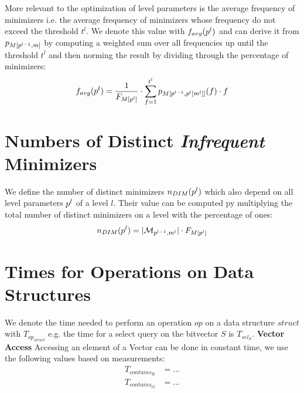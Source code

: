 \documentclass[a4paper,titlepage,onecolumn,oneside,12pt,nenglish,titlepage=firstiscover]{scrbook}
\theoremstyle{plain} %
\theoremstyle{definition} %
\theoremstyle{remark} %
\theoremstyle{plain}
\newcommand{\minimizerLength}{m}
\newcommand{\threshold}{t}
\newcommand{\level}{l}
\newcommand{\contains}{contains}
\newcommand{\select}{sel}
\newcommand{\timeForOperationOnStructure}[2]{T_{#1_{#2}}} %
\newcommand{\averageFrequency}{f_{avg}}
\begin{document}
More relevant to the optimization of level parameters is the average frequency of \infrequent minimizers i.e. the average frequency of minimizers whose frequency do not exceed the threshold $\threshold^\level$. We denote this value with $\averageFrequency(\levelParameters{\level})$ and can derive it from $\probabilityDistribution{\manualZV{M}{\levelParameters{\level-1}}{m}}$ by computing a weighted sum over all frequencies up until the threshold $\threshold^\level$ and then norming the result by dividing through the percentage of \infrequent minimizers:
\begin{equation} \label{equation:averageFrequency}
	\averageFrequency(\levelParameters{\level}) = \frac{1}{\CDF{\compactZV{M}{\levelParameters{\level}}}} \cdot
	\sum\limits_{f=1}^{\threshold^\level} \probabilityDistribution{\manualZV{M}{\levelParameters{\level-1}}{\parameterAccess{\level}{\minimizerLength}{\level}}}(f) \cdot f 
\end{equation}

\section{Numbers of Distinct \textit{Infrequent} Minimizers}
\newcommand{\numberOfDistinctMinimizers}[1]{n_{DIM}(#1)}
\newcommand{\varNumberOfDistinctMinimizers}{\textbf{n}_{\textbf{DIM}}}
We define the number of distinct \infrequent minimizers $\numberOfDistinctMinimizers{\levelParameters{\level}}$ which also depend on all level parameters $\levelParameters{\level}$ of a level $\level$.  Their value can be computed py multiplying the total number of distinct minimizers on a level with the percentage of \infrequent ones:
\begin{equation}
	\numberOfDistinctMinimizers{\levelParameters{\level}} = |\distinctMinimizers{\level}| \cdot \CDF{\compactZV{M}{\levelParameters{\level}}}
\end{equation}

\section{Times for Operations on Data Structures}
We denote the time needed to perform an operation $op$ on a data structure $struct$ with $\timeForOperationOnStructure{op}{struct}$ e.g. the time for a select query on the bitvector $S$ is $\timeForOperationOnStructure{\select}{S}$.
\textbf{Vector Access}
Accessing an element of a Vector can be done in constant time, we use the following values based on measurements:
\begin{align*}
	\timeForOperationOnStructure{\contains}{R} &= ...\\
	\timeForOperationOnStructure{\contains}{O} &= ...\\
\end{align*}
\end{document}
